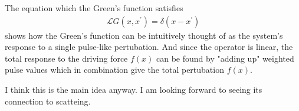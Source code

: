 The equation which the Green's function satisfies \begin{align*}
    \mathcal{L} G(x, x^{\prime}) = \delta (x - x^{\prime})
\end{align*} 
shows how the Green's function can be intuitively thought of as the system's response to a single pulse-like pertubation. And since the operator is linear, the total response to the driving force \(f(x)\) can be found by "adding up" weighted pulse values which in combination give the total pertubation \(f(x)\). 

I think this is the main idea anyway. I am looking forward to seeing its connection to scatteing. 
